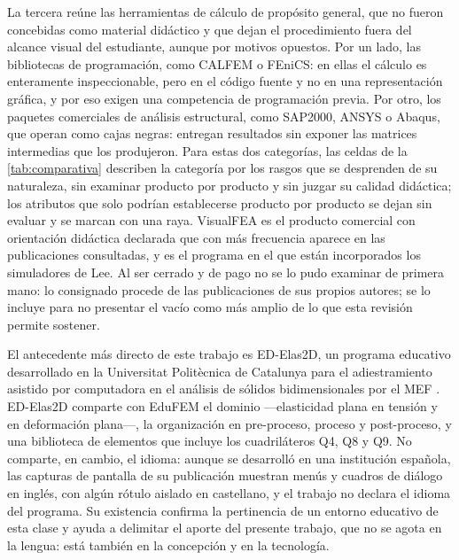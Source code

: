 La tercera reúne las herramientas de cálculo de propósito general, que no fueron concebidas como material didáctico y que dejan el procedimiento fuera del alcance visual del estudiante, aunque por motivos opuestos. Por un lado, las bibliotecas de programación, como CALFEM o FEniCS: en ellas el cálculo es enteramente inspeccionable, pero en el código fuente y no en una representación gráfica, y por eso exigen una competencia de programación previa. Por otro, los paquetes comerciales de análisis estructural, como SAP2000, ANSYS o Abaqus, que operan como cajas negras: entregan resultados sin exponer las matrices intermedias que los produjeron. Para estas dos categorías, las celdas de la \autoref{tab:comparativa} describen la categoría por los rasgos que se desprenden de su naturaleza, sin examinar producto por producto y sin juzgar su calidad didáctica; los atributos que solo podrían establecerse producto por producto se dejan sin evaluar y se marcan con una raya. VisualFEA es el producto comercial con orientación didáctica declarada que con más frecuencia aparece en las publicaciones consultadas, y es el programa en el que están incorporados los simuladores de Lee. Al ser cerrado y de pago no se lo pudo examinar de primera mano: lo consignado procede de las publicaciones de sus propios autores; se lo incluye para no presentar el vacío como más amplio de lo que esta revisión permite sostener.

El antecedente más directo de este trabajo es \mbox{ED-Elas2D}, un programa educativo desarrollado en la Universitat Politècnica de Catalunya para el adiestramiento asistido por computadora en el análisis de sólidos bidimensionales por el MEF \autocite{suarez1998edelas2d}. \mbox{ED-Elas2D} comparte con EduFEM el dominio —elasticidad plana en tensión y en deformación plana—, la organización en pre-proceso, proceso y post-proceso, y una biblioteca de elementos que incluye los cuadriláteros Q4, Q8 y Q9. No comparte, en cambio, el idioma: aunque se desarrolló en una institución española, las capturas de pantalla de su publicación muestran menús y cuadros de diálogo en inglés, con algún rótulo aislado en castellano, y el trabajo no declara el idioma del programa. Su existencia confirma la pertinencia de un entorno educativo de esta clase y ayuda a delimitar el aporte del presente trabajo, que no se agota en la lengua: está también en la concepción y en la tecnología.

